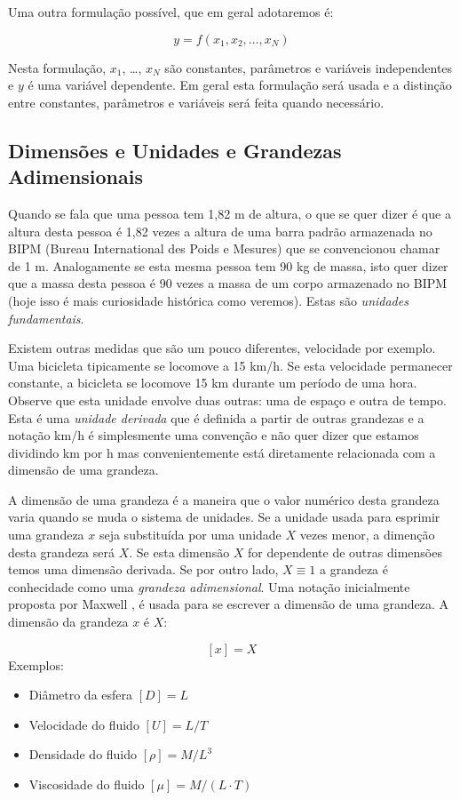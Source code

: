 Uma outra formulação possível, que em geral adotaremos é:

\[
y = f(x_1, x_2, \ldots, x_N)
\]

Nesta formulação, $x_1$, \ldots, $x_N$ são constantes, parâmetros e variáveis independentes e $y$ é uma variável dependente. Em geral esta formulação será usada e a distinção entre constantes, parâmetros e variáveis será feita quando necessário.



\subsection{Dimensões e Unidades e Grandezas Adimensionais}

Quando se fala que uma pessoa tem 1,82 m de altura, o que se quer dizer é que a altura desta pessoa é 1,82 vezes a altura de uma barra padrão armazenada no BIPM (Bureau International des Poids e Mesures) que se convencionou chamar de 1 m. Analogamente se esta mesma pessoa tem 90 kg de massa, isto quer dizer que a massa desta pessoa é 90 vezes a massa de um corpo armazenado no BIPM (hoje isso é mais curiosidade histórica como veremos). Estas são \emph{unidades fundamentais}. 

Existem outras medidas que são um pouco diferentes, velocidade por exemplo. Uma bicicleta tipicamente se locomove a 15 km/h. Se esta velocidade permanecer constante, a bicicleta se locomove 15 km durante um período de uma hora. Observe que esta unidade envolve duas outras: uma de espaço e outra de tempo. Esta é uma \emph{unidade derivada} que é definida a partir de outras grandezas e a notação km/h é simplesmente uma convenção e não quer dizer que estamos dividindo km por h mas convenientemente está diretamente relacionada com a dimensão de uma grandeza.

A dimensão de uma grandeza é a maneira que o valor numérico desta grandeza varia quando se muda o sistema de unidades. Se a unidade usada para esprimir uma grandeza $x$ seja substituída por uma unidade $X$ vezes menor, a dimenção desta grandeza será $X$. Se esta dimensão $X$ for dependente de outras dimensões temos uma dimensão derivada. Se por outro lado, $X\equiv 1$ a grandeza é conhecidade como uma \emph{grandeza adimensional}. Uma notação inicialmente proposta por Maxwell \cite{Maxwell1871}, é usada para se escrever a dimensão de uma grandeza. A dimensão da grandeza $x$ é $X$:

\[
  [x] = X
\]
Exemplos:
\begin{itemize}
\item Diâmetro da esfera $[D] = L$
\item Velocidade do fluido $[U] = L/T$
\item Densidade do fluido $[\rho] = M / L^3$
\item Viscosidade do fluido $[\mu] = M / (L\cdot T)$
\end{itemize}

